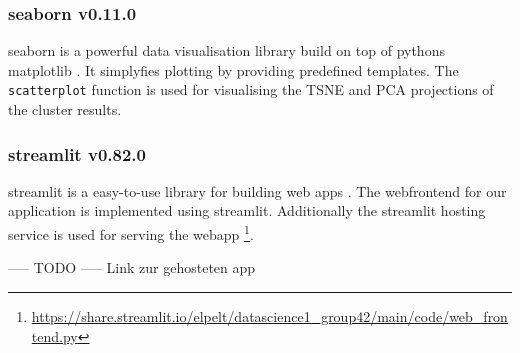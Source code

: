 \subsubsection[seaborn]{seaborn v0.11.0}
seaborn is a powerful data visualisation library build on top of pythons matplotlib \cite{seaborn}. It simplyfies plotting by providing predefined templates.  The \texttt{scatterplot} function is used for visualising the TSNE and PCA projections of the cluster results.

\subsubsection[streamlit]{streamlit v0.82.0}
streamlit is a easy-to-use library for building web apps \cite{streamlit}. The webfrontend for our application is implemented using streamlit. Additionally the streamlit hosting service is used for serving the webapp \footnote{\href{https://share.streamlit.io/elpelt/datascience1_group42/main/code/web_frontend.py}{https://share.streamlit.io/elpelt/datascience1\_group42/main/code/web\_frontend.py}}.

----- TODO ----- Link zur gehosteten app